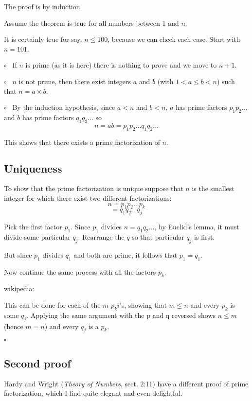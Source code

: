 \documentclass[11pt, oneside]{article}
\begin{document}
The proof is by induction.

Assume the theorem is true for all numbers between $1$ and $n$.  

It is certainly true for say, $n \le 100$, because we can check each case.  Start with $n = 101$.

$\circ$ \ If $n$ is prime (as it is here) there is nothing to prove and we move to $n + 1$.  

$\circ$ \  $n$ is not prime, then there exist integers $a$ and $b$ (with $1 < a \le b < n$) such that $n = a \times b$.

$\circ$ \ By the induction hypothesis, since $a < n$ and $b < n$, $a$ has prime factors $p_1 p_2 \dots$ and $b$ has prime factors $q_1 q_2 \dots$ so
\[ n = ab = p_1 p_2 \dots q_1 q_2 \dots \]

This shows that there exists a prime factorization of $n$.

\subsection*{Uniqueness}

To show that the prime factorization is unique suppose that $n$ is the smallest integer for which there exist two different factorizations:
\[ n = p_1 p_2 \dots p_k \]
\[ = q_1 q_2 \dots q_j \]
    
Pick the first factor $p_1$.  Since $p_1$ divides $n = q_1 q_2 \dots$, by Euclid's lemma, it must divide some particular $q_j$.  Rearrange the $q$ so that particular $q_j$ is first.

But since $p_1$ divides $q_1$ and both are prime, it follows that $p_1 = q_1$. 

Now continue the same process with all the factors $p_k$.

wikipedia:

    This can be done for each of the $m$ $p_ki$'s, showing that $m \le n$ and every $p_k$ is some $q_j$. Applying the same argument with the p and q reversed shows $n \le m$ (hence $m = n$) and every $q_j$ is a $p_k$.
    
$\square$
    
\subsection*{Second proof}

Hardy and Wright (\emph{Theory of Numbers}, sect. 2:11) have a different proof of prime factorization, which I find quite elegant and even delightful.
\end{document}
